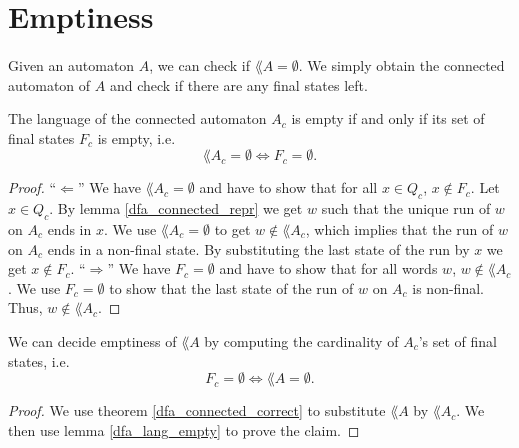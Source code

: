 

\section{Emptiness}
\paragraph{}
Given an automaton $A$, we can check if $\lang{A} = \emptyset$. We simply obtain the connected automaton of $A$ and check if there are any final states left. 

\begin{lemma}
    \label{dfa_lang_empty}
    The language of the connected automaton $A_c$ is empty if and only if its set of final states $F_c$ is empty, i.e.
    \begin{equation*}
        \lang{A_c} = \emptyset \iff F_c = \emptyset.
    \end{equation*}
\end{lemma}

\begin{proof}
    ``$\Leftarrow$''
    We have $\lang{A_c} = \emptyset$ and have to show that for all $x \in Q_c$, $x \notin F_c$.
    Let $x \in Q_c$. 
    By lemma \ref{dfa_connected_repr} we get $w$ such that the unique run of $w$ on $A_c$
    ends in $x$. 
    We use $\lang{A_c} = \emptyset$ to get $w \notin \lang{A_c}$, 
    which implies that the run of $w$ on $A_c$ ends in a non-final state.
    By substituting the last state of the run by $x$ we get $x \notin F_c$.
    ``$\Rightarrow$''
    We have $F_c = \emptyset$ and have to show that for all words $w$, $w \notin \lang{A_c}$.
    We use $F_c = \emptyset$ to show that the last state of the run of $w$ on $A_c$ is non-final.
    Thus, $w \notin \lang{A_c}$.
\end{proof}

\begin{theorem} We can decide emptiness of $\lang{A}$ by computing the cardinality of $A_c$'s set of final states, i.e.
    \label{AutomatonEmpty}
    \begin{equation*}        
        F_c = \emptyset \Longleftrightarrow \lang{A} = \emptyset.       
    \end{equation*}
\end{theorem}

\begin{proof}
    We use theorem \ref{dfa_connected_correct} to substitute $\lang{A}$ by $\lang{A_c}$.
    We then use lemma \ref{dfa_lang_empty} to prove the claim.
\end{proof}



